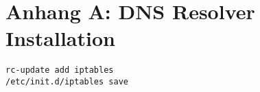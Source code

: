 \chapter*{Anhang A: DNS Resolver Installation}

\begin{lstlisting}
rc-update add iptables 
/etc/init.d/iptables save
\end{lstlisting}



